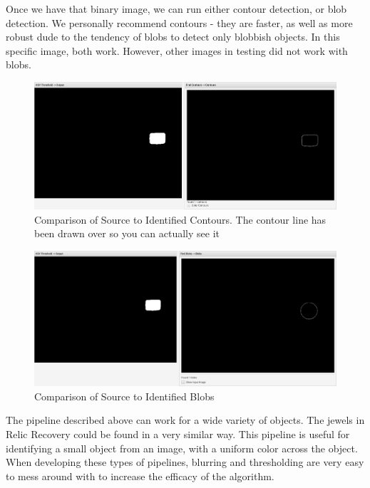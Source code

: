 \documentclass[../main.tex]{subfiles}
\begin{document}
Once we have that binary image, we can run either contour detection, or blob detection. We personally recommend contours - they are faster, as well as more robust dude to the tendency of blobs to detect only blobbish objects. In this specific image, both work. However, other images in testing did not work with blobs.
\begin{figure}[H]
    \centering
    \includegraphics[width=400pt]{sections/vision/images/opencv/gold_pipeline_contour.png}
    \caption{Comparison of Source to Identified Contours. The contour line has been drawn over so you can actually see it}
\end{figure}
\begin{figure}[H]
    \centering
    \includegraphics[width=400pt]{sections/vision/images/opencv/gold_pipeline_blob.png}
    \caption{Comparison of Source to Identified Blobs}
\end{figure}

The pipeline described above can work for a wide variety of objects. The jewels in Relic Recovery could be found in a very similar way. This pipeline is useful for identifying a small object from an image, with a uniform color across the object. When developing these types of pipelines, blurring and thresholding are very easy to mess around with to increase the efficacy of the algorithm.
\end{document}
